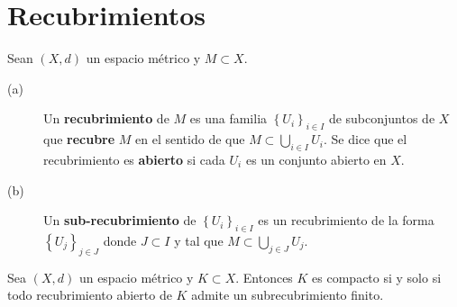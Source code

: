 \section{Recubrimientos}
\begin{definition}[Recubrimiento]
Sean $\displaystyle \left(X,d\right) $ un espacio métrico y $\displaystyle M \subset X $. 
\begin{description}
	\item[(a)] Un \textbf{recubrimiento} de $\displaystyle M $ es una familia $\displaystyle \left\{ U_{i}\right\} _{i \in I} $ de subconjuntos de $\displaystyle X $ que \textbf{recubre} $\displaystyle M $ en el sentido de que $\displaystyle M \subset \bigcup_{i \in I}U_{i} $. Se dice que el recubrimiento es \textbf{abierto} si cada $\displaystyle U_{i} $ es un conjunto abierto en $\displaystyle X $.
	\item[(b)] Un \textbf{sub-recubrimiento} de $\displaystyle \left\{ U_{i}\right\} _{i \in I} $ es un recubrimiento de la forma $\displaystyle \left\{ U_{j}\right\} _{j \in J} $ donde $\displaystyle J \subset I $ y tal que $\displaystyle M \subset \bigcup_{j \in J}U_{j} $.
\end{description}
\end{definition}
\begin{theorem}
Sea $\displaystyle \left(X,d\right) $ un espacio métrico y $\displaystyle K \subset X $. Entonces $\displaystyle K $ es compacto si y solo si todo recubrimiento abierto de $\displaystyle K $ admite un subrecubrimiento finito.
\end{theorem}

